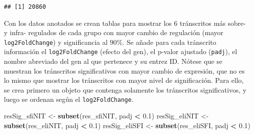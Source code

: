 \documentclass[
]{article}
\newenvironment{Shaded}{\begin{snugshade}}{\end{snugshade}}
\newcommand{\DataTypeTok}[1]{\textcolor[rgb]{0.13,0.29,0.53}{#1}}
\newcommand{\FloatTok}[1]{\textcolor[rgb]{0.00,0.00,0.81}{#1}}
\newcommand{\KeywordTok}[1]{\textcolor[rgb]{0.13,0.29,0.53}{\textbf{#1}}}
\newcommand{\NormalTok}[1]{#1}
\newcommand{\OperatorTok}[1]{\textcolor[rgb]{0.81,0.36,0.00}{\textbf{#1}}}
\newcommand{\StringTok}[1]{\textcolor[rgb]{0.31,0.60,0.02}{#1}}
\begin{document}
\begin{Shaded}
\end{Shaded}

\begin{verbatim}
## [1] 20860
\end{verbatim}

Con los datos anotados se crean tablas para mostrar los 6 tránscritos
más sobre- y infra- regulados de cada grupo con mayor cambio de
regulación (mayor \texttt{log2FoldChange}) y significancia al \(90\%\).
Se añade para cada tránscrito información el \texttt{log2FoldChange}
(efecto del gen), el p-valor ajustado (\texttt{padj}), el nombre
abreviado del gen al que pertenece y su entrez ID. Nótese que se
muestran los tránscritos significativos con mayor cambio de expresión,
que no es lo mismo que mostrar los tránscritos con mayor nivel de
significación. Para ello, se crea primero un objeto que contenga
solamente los tránscritos significativos, y luego se ordenan según el
\texttt{log2FoldChange}.

\begin{Shaded}
\begin{Highlighting}[]
\NormalTok{resSig_sfiNIT <-}\StringTok{ }\KeywordTok{subset}\NormalTok{(res_sfiNIT, padj }\OperatorTok{<}\StringTok{ }\FloatTok{0.1}\NormalTok{)}
\NormalTok{resSig_eliNIT <-}\StringTok{ }\KeywordTok{subset}\NormalTok{(res_eliNIT, padj }\OperatorTok{<}\StringTok{ }\FloatTok{0.1}\NormalTok{)}
\NormalTok{resSig_eliSFI <-}\StringTok{ }\KeywordTok{subset}\NormalTok{(res_eliSFI, padj }\OperatorTok{<}\StringTok{ }\FloatTok{0.1}\NormalTok{)}
\end{Highlighting}
\end{Shaded}
\end{document}
